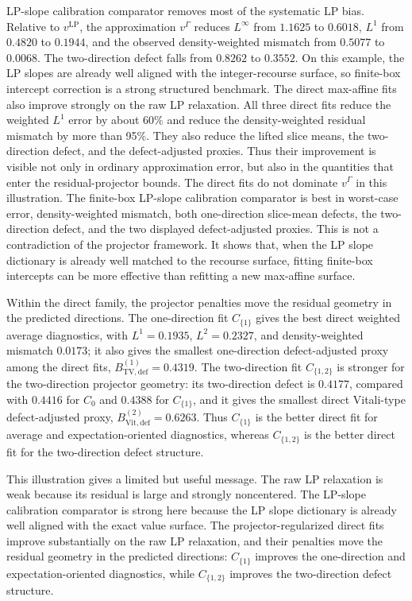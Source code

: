 \documentclass[11pt,letterpaper]{article}
\theoremstyle{definition}
\theoremstyle{remark}
\newcommand{\LP}{\mathrm{LP}}
\newcommand{\TV}{\mathrm{TV}}
\newcommand{\Vit}{\mathrm{Vit}}
\newcommand{\Def}{\mathrm{def}}
\begin{document}
LP-slope calibration comparator removes most of the systematic LP bias.
Relative to $v^{\LP}$, the approximation $v^\Gamma$ reduces $L^\infty$ from
$1.1625$ to $0.6018$, $L^1$ from $0.4820$ to $0.1944$, and the observed
density-weighted mismatch from $0.5077$ to $0.0068$. The two-direction defect
falls from $0.8262$ to $0.3552$. On this example, the LP slopes are already
well aligned with the integer-recourse surface, so finite-box intercept
correction is a strong structured benchmark.
The direct max-affine fits also improve strongly on the raw LP relaxation.
All three direct fits reduce the weighted $L^1$ error by about $60\%$
and reduce the density-weighted residual mismatch by more than 95\%. They also reduce the lifted slice means, the two-direction defect,
and the defect-adjusted proxies. Thus their improvement is visible not only in
ordinary approximation error, but also in the quantities that enter the
residual-projector bounds.
The direct fits do not dominate $v^\Gamma$ in this illustration. The finite-box LP-slope calibration comparator is best in worst-case error, density-weighted mismatch, both
one-direction slice-mean defects, the two-direction defect, and the two
displayed defect-adjusted proxies. This is not a contradiction of the
projector framework. It shows that, when the LP slope dictionary is already
well matched to the recourse surface, fitting finite-box intercepts can be more
effective than refitting a new max-affine surface.

Within the direct family, the projector penalties move the residual geometry in
the predicted directions. The one-direction fit $C_{\{1\}}$ gives the best direct
weighted average diagnostics, with $L^1=0.1935$, $L^2=0.2327$, and
density-weighted mismatch $0.0173$; it also gives the smallest one-direction
defect-adjusted proxy among the direct fits, $B^{(1)}_{\TV,\Def}=0.4319$.
The two-direction fit $C_{\{1,2\}}$ is stronger for the two-direction projector
geometry: its two-direction defect is $0.4177$, compared with $0.4416$ for
$C_0$ and $0.4388$ for $C_{\{1\}}$, and it gives the smallest direct
Vitali-type defect-adjusted proxy, $B^{(2)}_{\Vit,\Def}=0.6263$. Thus $C_{\{1\}}$
is the better direct fit for average and expectation-oriented diagnostics,
whereas $C_{\{1,2\}}$ is the better direct fit for the two-direction defect structure.



This illustration gives a limited but useful message. The raw LP relaxation is
weak because its residual is large and strongly noncentered. The LP-slope calibration comparator is strong here because the LP slope dictionary is already
well aligned with the exact value surface. The projector-regularized direct
fits improve substantially on the raw LP relaxation, and their penalties move
the residual geometry in the predicted directions: $C_{\{1\}}$ improves the
one-direction and expectation-oriented diagnostics, while $C_{\{1,2\}}$ improves the
two-direction defect structure.
\end{document}
